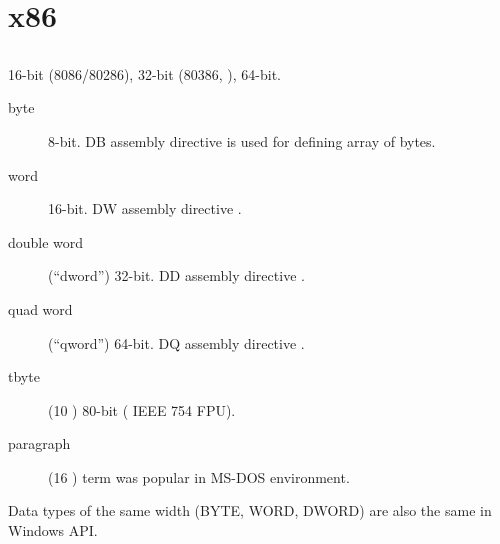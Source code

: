 \section{x86}

\subsection{}

 16-bit (8086/80286), 32-bit (80386, ), 64-bit.

\begin{description}
	\item[byte] 8-bit. 
		{DB assembly directive is used for defining array of bytes}.
	\item[word] 16-bit. 
		{DW assembly directive \dittoclosing{}}.
	\item[double word] (``dword'') 32-bit. 
		{DD assembly directive \dittoclosing{}}.
	\item[quad word] (``qword'') 64-bit. 
		{DQ assembly directive \dittoclosing{}}.
	\item[tbyte] (10 ) 80-bit   
		( IEEE 754 FPU).
	\item[paragraph] (16 )\EMDASH{}
	{term was popular in MS-DOS environment}.
\end{description}

{Data types of the same width (BYTE, WORD, DWORD) are also the same in} Windows \ac{API}.

